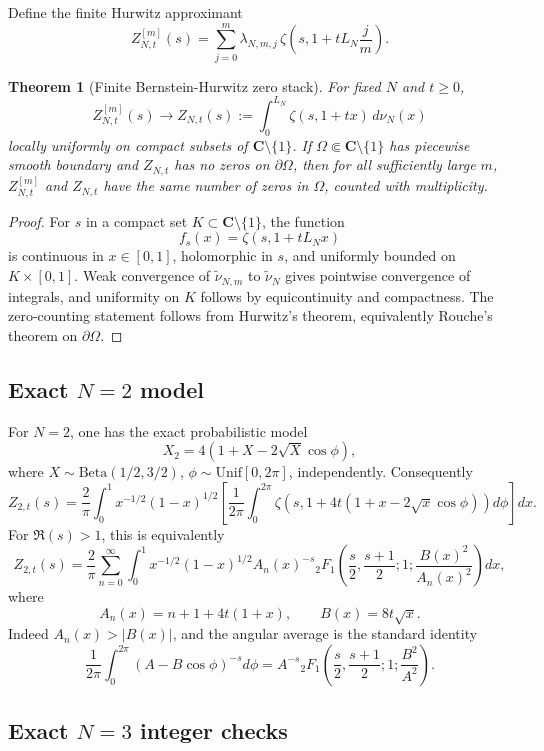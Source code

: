 \documentclass[11pt]{article}
\newcommand{\C}{\mathbf C}
\newcommand{\wt}{\widetilde}
\theoremstyle{plain}
\newtheorem{theorem}{Theorem}[section]
\theoremstyle{definition}
\numberwithin{equation}{section}
\begin{document}
Define the finite Hurwitz approximant
\[
 Z_{N,t}^{[m]}(s)=\sum_{j=0}^m\lambda_{N,m,j}\,
 \zeta\left(s,1+tL_N\frac jm\right).
\]

\begin{theorem}[Finite Bernstein-Hurwitz zero stack]\label{thm:bernstein-hurwitz}
For fixed \(N\) and \(t\ge0\),
\[
 Z_{N,t}^{[m]}(s)\longrightarrow
 Z_{N,t}(s):=\int_0^{L_N}\zeta(s,1+tx)\,d\nu_N(x)
\]
locally uniformly on compact subsets of \(\C\setminus\{1\}\).  If \(\Omega\Subset\C\setminus\{1\}\) has piecewise smooth boundary and \(Z_{N,t}\) has no zeros on \(\partial\Omega\), then for all sufficiently large \(m\), \(Z_{N,t}^{[m]}\) and \(Z_{N,t}\) have the same number of zeros in \(\Omega\), counted with multiplicity.
\end{theorem}

\begin{proof}
For \(s\) in a compact set \(K\subset\C\setminus\{1\}\), the function
\[
 f_s(x)=\zeta(s,1+tL_Nx)
\]
is continuous in \(x\in[0,1]\), holomorphic in \(s\), and uniformly bounded on \(K\times[0,1]\).  Weak convergence of \(\wt\nu_{N,m}\) to \(\wt\nu_N\) gives pointwise convergence of integrals, and uniformity on \(K\) follows by equicontinuity and compactness.  The zero-counting statement follows from Hurwitz's theorem, equivalently Rouche's theorem on \(\partial\Omega\).
\end{proof}

\subsection{Exact \(N=2\) model}

For \(N=2\), one has the exact probabilistic model
\[
 X_2=4(1+X-2\sqrt X\cos\phi),
\]
where \(X\sim\mathrm{Beta}(1/2,3/2)\), \(\phi\sim\mathrm{Unif}[0,2\pi]\), independently.  Consequently
\[
 Z_{2,t}(s)=\frac2\pi\int_0^1 x^{-1/2}(1-x)^{1/2}
 \left[\frac1{2\pi}\int_0^{2\pi}\zeta\left(s,1+4t(1+x-2\sqrt x\cos\phi)\right)d\phi\right]dx.
\]
For \(\Re(s)>1\), this is equivalently
\[
 Z_{2,t}(s)=\frac2\pi\sum_{n=0}^{\infty}\int_0^1 x^{-1/2}(1-x)^{1/2}A_n(x)^{-s}
 {}_2F_1\left(\frac s2,\frac{s+1}{2};1;\frac{B(x)^2}{A_n(x)^2}\right)dx,
\]
where
\[
 A_n(x)=n+1+4t(1+x),
 \qquad
 B(x)=8t\sqrt x.
\]
Indeed \(A_n(x)>|B(x)|\), and the angular average is the standard identity
\[
 \frac1{2\pi}\int_0^{2\pi}(A-B\cos\phi)^{-s}d\phi
 =A^{-s}{}_2F_1\left(\frac s2,\frac{s+1}{2};1;\frac{B^2}{A^2}\right).
\]

\subsection{Exact \(N=3\) integer checks}
\end{document}
